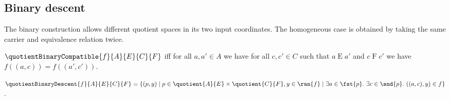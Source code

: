 \subsection{Binary descent}

The binary construction allows different quotient spaces in its two input
coordinates.  The homogeneous case is obtained by taking the same carrier
and equivalence relation twice.

\begin{definition}\label{quotient_binary_compatible}
    $\quotientBinaryCompatible{f}{A}{E}{C}{F}$ iff
        for all $a,a'\in A$ we have for all $c,c'\in C$ such that
            $a\mathrel{E}a'$ and $c\mathrel{F}c'$ we have
            $f((a,c))=f((a',c'))$.
\end{definition}

\begin{definition}\label{quotient_binary_descent}
    $\quotientBinaryDescent{f}{A}{E}{C}{F}=
        \{(p,y)\mid
            p\in\quotient{A}{E}\times\quotient{C}{F},y\in\ran{f}\mid
            \exists a\in\fst{p}.\ \exists c\in\snd{p}.\ ((a,c),y)\in f\}$.
\end{definition}

